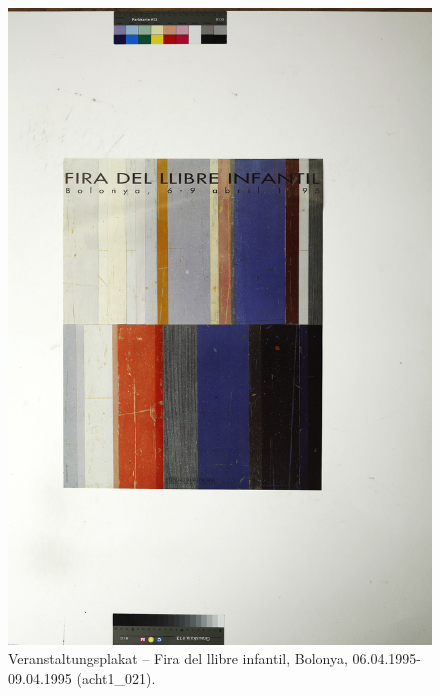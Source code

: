 \documentclass[a4paper,12pt,ngerman]{article}
\begin{document}
\newpage
\begin{figure}[ht]
\includegraphics[width=\linewidth]{Abbildung_33_(acht1_021)}
\centering
\caption{Veranstaltungsplakat -- Fira del llibre infantil, Bolonya, 06.04.1995-09.04.1995 (acht1\_021).}
\end{figure}
\end{document}
